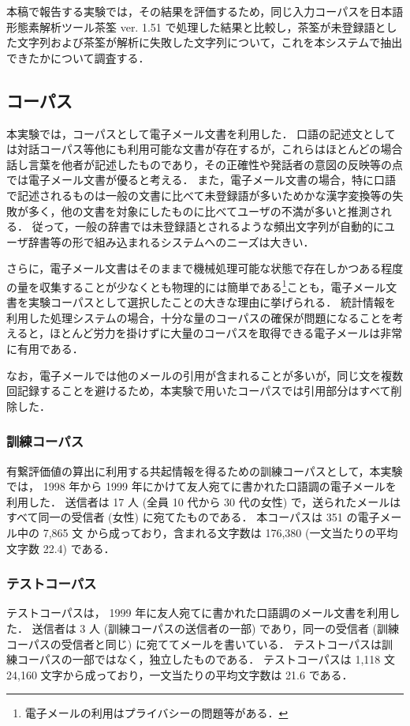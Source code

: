 本稿で報告する実験では，その結果を評価するため，同じ入力コーパスを日本語形態素解析ツール茶筌 ver. 1.51\cite{chasen97} で処理した結果と比較し，茶筌が未登録語とした文字列および茶筌が解析に失敗した文字列について，これを本システムで抽出できたかについて調査する．
\subsection{コーパス}
\label{sec:corpus}
本実験では，コーパスとして電子メール文書を利用した．
口語の記述文としては対話コーパス等他にも利用可能な文書が存在するが，これらはほとんどの場合話し言葉を他者が記述したものであり，その正確性や発話者の意図の反映等の点では電子メール文書が優ると考える．
また，電子メール文書の場合，特に口語で記述されるものは一般の文書に比べて未登録語が多いためかな漢字変換等の失敗が多く，他の文書を対象にしたものに比べてユーザの不満が多いと推測される．
従って，一般の辞書では未登録語とされるような頻出文字列が自動的にユーザ辞書等の形で組み込まれるシステムへのニーズは大きい．

さらに，電子メール文書はそのままで機械処理可能な状態で存在しかつある程度の量を収集することが少なくとも物理的には簡単である\footnote{電子メールの利用はプライバシーの問題等がある．}ことも，電子メール文書を実験コーパスとして選択したことの大きな理由に挙げられる．
統計情報を利用した処理システムの場合，十分な量のコーパスの確保が問題になることを考えると，ほとんど労力を掛けずに大量のコーパスを取得できる電子メールは非常に有用である．

なお，電子メールでは他のメールの引用が含まれることが多いが，同じ文を複数回記録することを避けるため，本実験で用いたコーパスでは引用部分はすべて削除した．
\subsubsection{訓練コーパス}
\label{sec:trcorpus}
有繋評価値の算出に利用する共起情報を得るための訓練コーパスとして，本実験では， 1998 年から 1999 年にかけて友人宛てに書かれた口語調の電子メールを利用した．
送信者は 17 人 (全員 10 代から 30 代の女性) で，送られたメールはすべて同一の受信者 (女性) に宛てたものである．
本コーパスは 351 の電子メール中の 7,865 文 から成っており，含まれる文字数は 176,380 (一文当たりの平均文字数 22.4) である．
\subsubsection{テストコーパス}
\label{sec:tscorpus}
テストコーパスは， 1999 年に友人宛てに書かれた口語調のメール文書を利用した．
送信者は 3 人 (訓練コーパスの送信者の一部) 
であり，同一の受信者 (訓練コーパスの受信者と同じ) に宛ててメールを書いている．
テストコーパスは訓練コーパスの一部ではなく，独立したものである．
テストコーパスは 1,118 文 24,160 文字から成っており，一文当たりの平均文字数は 21.6 である．
